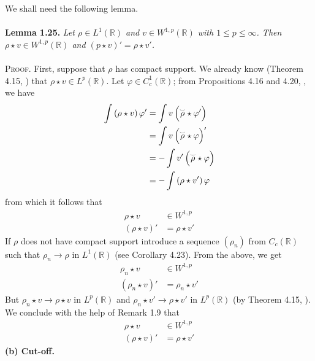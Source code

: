 \documentclass[a4paper,oneside]{book}
\numberwithin{equation}{chapter}
\begin{document}
We shall need the following lemma.\\
\\
\textbf{Lemma 1.25.} \textit{Let $\rho \in L^1\left(\mathbb{R}\right)$ and $v\in W^{1,p}\left(\mathbb{R}\right)$ with $1\le p\le \infty$. Then $\rho \star v \in W^{1,p}\left(\mathbb{R}\right)$ and $\left(p\star v\right)'=\rho \star v'$.}\\
\\
\textsc{Proof.} First, suppose that $\rho$ has compact support. We already know (Theorem 4.15, \cite{1}) that $\rho \star v\in L^p\left(\mathbb{R}\right)$. Let $\varphi \in C_c^1\left(\mathbb{R}\right)$; from Propositions 4.16 and 4.20, \cite{1}, we have
\begin{align}
\int {\left( {\rho \star v} \right)\varphi '}  &= \int {v\left( {\mathord{\buildrel{\lower3pt\hbox{$\scriptscriptstyle\smile$}} 
\over \rho } \star \varphi '} \right)} \\
 &= \int {v\left( {\mathord{\buildrel{\lower3pt\hbox{$\scriptscriptstyle\smile$}} 
\over \rho } \star \varphi } \right)'} \\
& =  - \int {v'\left( {\mathord{\buildrel{\lower3pt\hbox{$\scriptscriptstyle\smile$}} 
\over \rho } \star \varphi } \right)} \\
& =  - \int {\left( {\rho \star v'} \right)\varphi } 
\end{align}
from which it follows that
\begin{align}
\rho \star v &\in {W^{1,p}}\\
\left( {\rho \star v} \right)' &= \rho \star v'
\end{align}
If $\rho$ does not have compact support introduce a sequence $\left(\rho _n\right)$ from $C_c\left(\mathbb{R}\right)$ such that $\rho _n\to \rho $ in $L^1\left(\mathbb{R}\right)$ (see Corollary 4.23). From the above, we get
\begin{align}
\rho _n\star v &\in {W^{1,p}}\\
\left( {\rho _n \star v} \right)' &= \rho _n \star v'
\end{align}
But $\rho _n\star v \to \rho \star v$ in $L^p\left(\mathbb{R}\right)$ and $\rho _n\star v' \to \rho \star v'$ in $L^p\left(\mathbb{R}\right)$ (by Theorem 4.15, \cite{1}). We conclude with the help of Remark 1.9 that
\begin{align}
\rho \star v &\in {W^{1,p}}\\
\left( {\rho \star v} \right)' &= \rho \star v'
\end{align}
\textbf{(b) Cut-off.}
\end{document}
